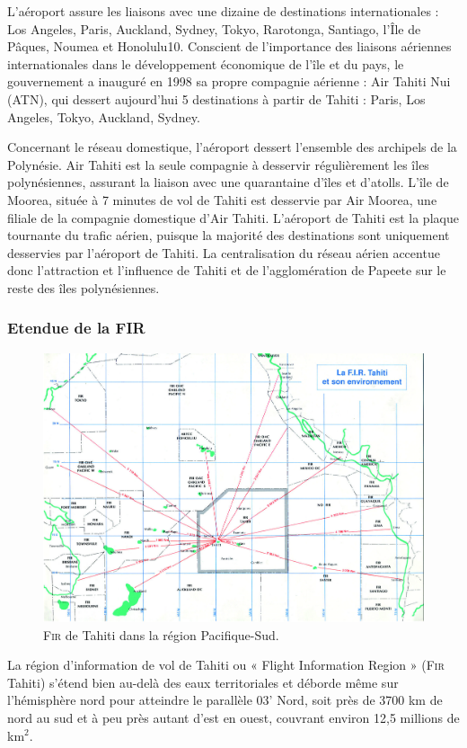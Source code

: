 L’aéroport assure les liaisons avec une dizaine de destinations internationales : Los Angeles, Paris, Auckland, Sydney, Tokyo, Rarotonga, Santiago, l’Île de Pâques, Noumea et Honolulu10. Conscient de l’importance des liaisons aériennes internationales dans le développement économique de l’île et du pays, le gouvernement a inauguré en 1998 sa propre compagnie aérienne : Air Tahiti Nui (ATN), qui dessert aujourd’hui 5 destinations à partir de Tahiti : Paris, Los Angeles, Tokyo, Auckland, Sydney.

Concernant le réseau domestique, l’aéroport dessert l’ensemble des archipels de la Polynésie. Air Tahiti est la seule compagnie à desservir régulièrement les îles polynésiennes, assurant la liaison avec une quarantaine d’îles et d’atolls. L’île de Moorea, située à 7 minutes de vol de Tahiti est desservie par Air Moorea, une filiale de la compagnie domestique d’Air Tahiti. L’aéroport de Tahiti est la plaque tournante du trafic aérien, puisque la majorité des destinations sont uniquement desservies par l’aéroport de Tahiti. La centralisation du réseau aérien accentue donc l’attraction et l’influence de Tahiti et de l’agglomération de Papeete sur le reste des îles polynésiennes.

        \subsubsection{Etendue de la \textsc{FIR}\label{Fir}}
\begin{figure}[!h]
\center
\includegraphics[width=15cm]{images/fir.png}
\caption{\textsc{Fir} de Tahiti dans la région Pacifique-Sud.}
\label{stats}
\end{figure}
La région d'information de vol de Tahiti ou « Flight Information Region » (\textsc{Fir} Tahiti) s'étend bien au-delà des eaux territoriales et déborde même sur l'hémisphère nord pour atteindre le parallèle 03' Nord, soit près de 3700 km de nord au sud et à peu près autant d'est en ouest, couvrant environ 12,5 millions de km$^2$.

